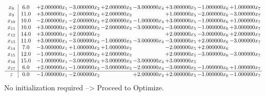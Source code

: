 \documentclass[10pt]{article}
\begin{document}
\[\begin{array}{c| c c@{\hskip 2pt} c@{\hskip 2pt} c@{\hskip 2pt} c@{\hskip 2pt} c@{\hskip 2pt} c@{\hskip 2pt} c@{\hskip 2pt} }
 x_{8}   &  6.0 & + 2.000000 x_{1} & -3.000000 x_{2} & + 2.000000 x_{3} & -3.000000 x_{4} & + 3.000000 x_{5} & -1.000000 x_{6} & + 1.000000 x_{7}\\
 x_{9}   &  11.0 & + 3.000000 x_{1} & -2.000000 x_{2} & + 2.000000 x_{3} &   & + 1.000000 x_{5} & -2.000000 x_{6} & -3.000000 x_{7}\\
 x_{10}   &  10.0 & -2.000000 x_{1} & -2.000000 x_{2} & + 2.000000 x_{3} & -1.000000 x_{4} & + 3.000000 x_{5} & -1.000000 x_{6} & + 1.000000 x_{7}\\
 x_{11}   &  10.0 & + 3.000000 x_{1} & + 2.000000 x_{2} & -2.000000 x_{3} & -3.000000 x_{4} & -3.000000 x_{5} & -1.000000 x_{6} & + 3.000000 x_{7}\\
 x_{12}   &  14.0 & + 3.000000 x_{1} & + 2.000000 x_{2} &    &   & + 2.000000 x_{5} & -3.000000 x_{6} & + 2.000000 x_{7}\\
 x_{13}   &  11.0 & + 3.000000 x_{1} & -3.000000 x_{2} & -1.000000 x_{3} & -3.000000 x_{4} & -3.000000 x_{5} & + 2.000000 x_{6} & -3.000000 x_{7}\\
 x_{14}   &  7.0 & -3.000000 x_{1} & + 1.000000 x_{2} & + 1.000000 x_{3} &   & -2.000000 x_{5} & + 2.000000 x_{6} &   \\
 x_{15}   &  12.0 & -1.000000 x_{1} & -1.000000 x_{2} & + 2.000000 x_{3} &   & + 2.000000 x_{5} & -3.000000 x_{6} & -3.000000 x_{7}\\
 x_{16}   &  15.0 & -1.000000 x_{1} & -3.000000 x_{2} & + 3.000000 x_{3} & -3.000000 x_{4} & + 3.000000 x_{5} &    &   \\
 x_{17}   &  6.0 & + 2.000000 x_{1} & -1.000000 x_{2} & -3.000000 x_{3} & -2.000000 x_{4} & -3.000000 x_{5} & -1.000000 x_{6} & + 1.000000 x_{7}\\
\hline
z    &  0.0 & -1.000000 x_{1} & -2.000000 x_{2} &   & + 2.000000 x_{4} & + 2.000000 x_{5} & -1.000000 x_{6} & -1.000000 x_{7}\\
\end{array}\]
No initialization required --> Proceed to Optimize. 
\end{document}

